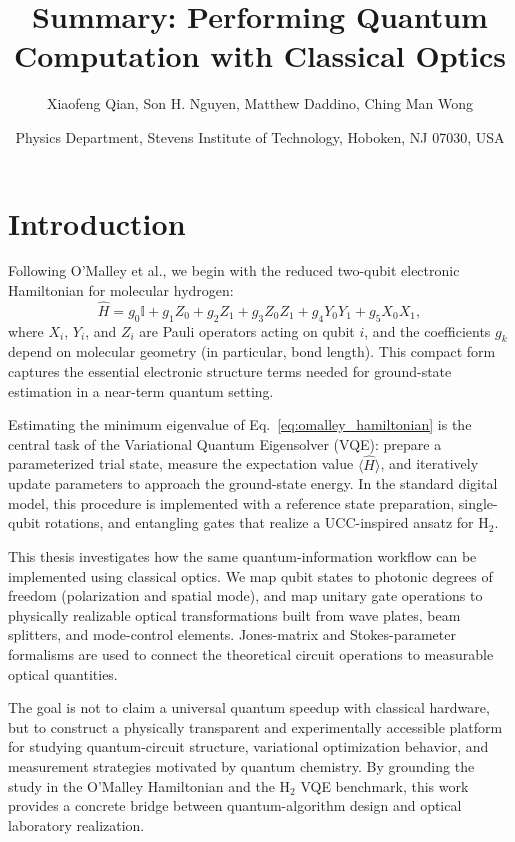 \documentclass[
	a4paper, %
	10pt, %
	unnumberedsections, %
	twoside, %
]{LTJournalArticle}
\title{Summary: Performing Quantum Computation with Classical Optics} %
\author{%
	Xiaofeng Qian, Son H. Nguyen, Matthew Daddino, Ching Man Wong
}
\date{Physics Department, Stevens Institute of Technology, Hoboken, NJ 07030, USA}
\begin{document}
\maketitle %


\section{Introduction}

Following O'Malley et al., we begin with the reduced two-qubit electronic Hamiltonian for molecular hydrogen:
\begin{equation}
\hat{H} = g_0 \mathbb{I} + g_1 Z_0 + g_2 Z_1 + g_3 Z_0 Z_1 + g_4 Y_0 Y_1 + g_5 X_0 X_1,
\label{eq:omalley_hamiltonian}
\end{equation}
where $X_i$, $Y_i$, and $Z_i$ are Pauli operators acting on qubit $i$, and the coefficients $g_k$ depend on molecular geometry (in particular, bond length). This compact form captures the essential electronic structure terms needed for ground-state estimation in a near-term quantum setting.

Estimating the minimum eigenvalue of Eq.~\ref{eq:omalley_hamiltonian} is the central task of the Variational Quantum Eigensolver (VQE): prepare a parameterized trial state, measure the expectation value $\langle \hat{H} \rangle$, and iteratively update parameters to approach the ground-state energy. In the standard digital model, this procedure is implemented with a reference state preparation, single-qubit rotations, and entangling gates that realize a UCC-inspired ansatz for H$_2$.

This thesis investigates how the same quantum-information workflow can be implemented using classical optics. We map qubit states to photonic degrees of freedom (polarization and spatial mode), and map unitary gate operations to physically realizable optical transformations built from wave plates, beam splitters, and mode-control elements. Jones-matrix and Stokes-parameter formalisms are used to connect the theoretical circuit operations to measurable optical quantities.

The goal is not to claim a universal quantum speedup with classical hardware, but to construct a physically transparent and experimentally accessible platform for studying quantum-circuit structure, variational optimization behavior, and measurement strategies motivated by quantum chemistry. By grounding the study in the O'Malley Hamiltonian and the H$_2$ VQE benchmark, this work provides a concrete bridge between quantum-algorithm design and optical laboratory realization.
\end{document}
